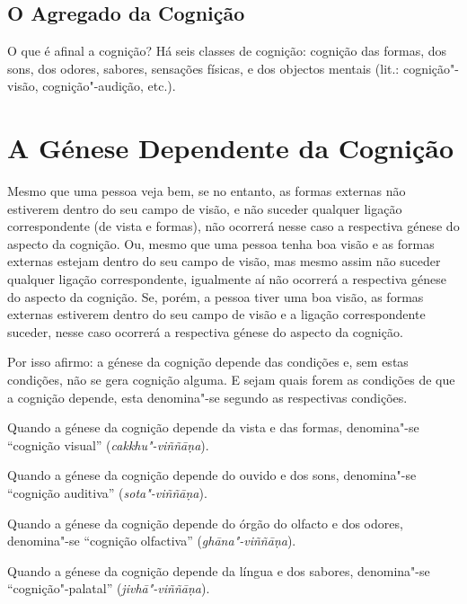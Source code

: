 \subsection{O Agregado da Cognição}


O que é afinal a cognição? Há seis classes de cognição: cognição das formas, dos
sons, dos odores, sabores, sensações físicas, e dos objectos mentais (lit.:
cognição"-visão, cognição"-audição, etc.).


\section{A Génese Dependente da Cognição}

Mesmo que uma pessoa veja bem, se no entanto, as formas externas não estiverem
dentro do seu campo de visão, e não suceder qualquer ligação correspondente (de
vista e formas), não ocorrerá nesse caso a respectiva génese do aspecto da
cognição. Ou, mesmo que uma pessoa tenha boa visão e as formas externas estejam
dentro do seu campo de visão, mas mesmo assim não suceder qualquer ligação
correspondente, igualmente aí não ocorrerá a respectiva génese do aspecto da
cognição. Se, porém, a pessoa tiver uma boa visão, as formas externas estiverem
dentro do seu campo de visão e a ligação correspondente suceder, nesse caso
ocorrerá a respectiva génese do aspecto da cognição.


Por isso afirmo: a génese da cognição depende das condições e, sem estas
condições, não se gera cognição alguma. E sejam quais forem as condições de que
a cognição depende, esta denomina"-se segundo as respectivas condições.

Quando a génese da cognição depende da vista e das formas, denomina"-se
``cognição visual'' (\emph{cakkhu"-viññāṇa}).

Quando a génese da cognição depende do ouvido e dos sons, denomina"-se ``cognição
auditiva'' (\emph{sota"-viññāṇa}).

Quando a génese da cognição depende do órgão do olfacto e dos odores,
denomina"-se ``cognição olfactiva'' (\emph{ghāna"-viññāṇa}).

Quando a génese da cognição depende da língua e dos sabores, denomina"-se
``cognição"-palatal'' (\emph{jivhā"-viññāṇa}).

